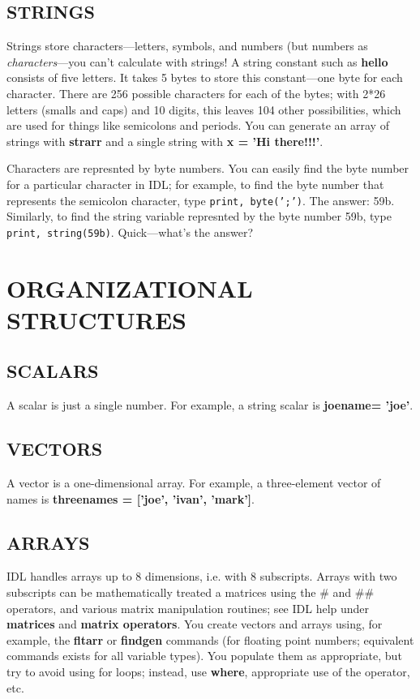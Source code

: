 \documentclass[psfig,preprint]{aastex}
\begin{document}
  \subsection {STRINGS} \label{strings}

	Strings store characters---letters, symbols, and numbers (but
numbers as {\it characters}---you can't calculate with strings! A string
constant such as {\bf hello} consists of five letters.  It takes 5 bytes
to store this constant---one byte for each character.  There are 256
possible characters for each of the bytes; with 2*26 letters (smalls and
caps) and 10 digits, this leaves 104 other possibilities, which are used
for things like semicolons and periods.  You can generate an array of
strings with {\bf strarr} and a single string with {\bf x = 'Hi
there!!!'}. 

Characters are represnted by byte numbers. You can easily find the byte
number for a particular character in IDL; for example, to find the byte
number that represents the semicolon character, type {\tt print, byte(';')}.
The answer: 59b. Similarly, to find the string variable represnted by the
byte number 59b, type {\tt print, string(59b)}. Quick---what's the answer?

\section{ ORGANIZATIONAL STRUCTURES}

\subsection{ SCALARS}

	A scalar is just a single number. For example, a string scalar
is {\bf joename= 'joe'}.

\subsection{ VECTORS}

	A vector is a one-dimensional array. For example, a
three-element vector of names is {\bf threenames = ['joe', 'ivan',
'mark']}.

\subsection{ ARRAYS}

	IDL handles arrays up to 8 dimensions, i.e. with 8 subscripts.
Arrays with two subscripts can be mathematically treated a matrices
using the $\#$ and $\#\#$ operators, and various matrix manipulation
routines; see IDL help under {\bf matrices} and {\bf matrix operators}. 
You create vectors and arrays using, for example, the {\bf fltarr} or
{\bf findgen} commands (for floating point numbers; equivalent commands
exists for all variable types). You populate them as appropriate, but
try to avoid using for loops; instead, use {\bf where}, appropriate use
of the {\bf *} operator, etc.
\end{document}
